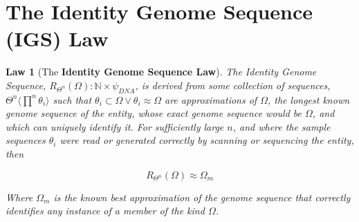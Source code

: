 \documentclass[a4paper, 18pt]{book} %
\newtheorem{law}{Law}
\begin{document}
\section{The Identity Genome Sequence (IGS) Law}
\label{SECIGSL}

\begin{law}[The \textbf{Identity Genome Sequence Law}]
\label{LAWGDL}
The Identity Genome Sequence, $R_{\Theta^n}(\Omega): \mathbb{N} \times \psi_{DNA}$, is derived from some collection of sequences, $\Theta^n \langle \prod\limits^n \theta_i \rangle$ such that $\theta_i \subset \Omega \lor \theta_i \approx \Omega$ are approximations of $\Omega$, the longest known genome sequence of the entity, whose exact genome sequence would be $\Omega$, and which can uniquely identify it. For sufficiently large $n$, and where the sample sequences $\theta_i$ were read or generated correctly by scanning or sequencing the entity, then 

\begin{equation}
\label{SEQRofOM}
R_{\Theta^n}(\Omega) \approx \Omega_m
\end{equation} 

Where $\Omega_m$ is the known best approximation of the genome sequence that correctly identifies any instance of a member of the kind $\Omega$.
\end{law}
\end{document}
